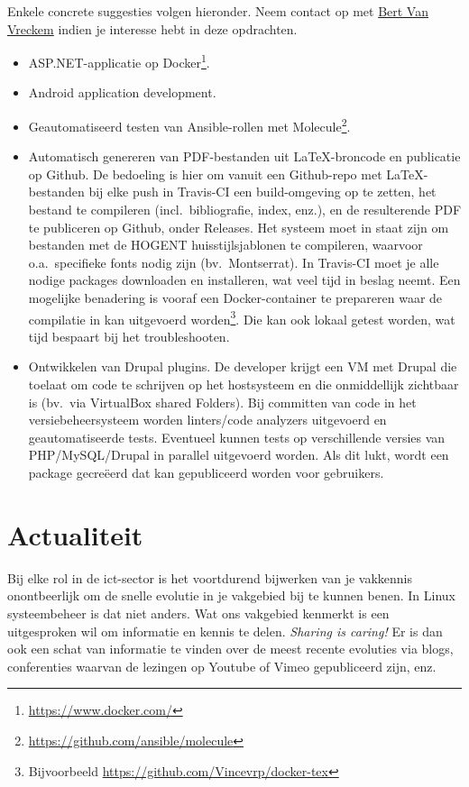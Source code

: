 Enkele concrete suggesties volgen hieronder. Neem contact op met \href{mailto:bert.vanvreckem@hogent.be}{Bert Van Vreckem} indien je interesse hebt in deze opdrachten.

\begin{itemize}
  \item ASP.NET-applicatie op Docker\footnote{\url{https://www.docker.com/}}.
  
  \item Android application development.
  
  \item Geautomatiseerd testen van Ansible-rollen met Molecule\footnote{\url{https://github.com/ansible/molecule}}.
  
  \item Automatisch genereren van PDF-bestanden uit \LaTeX{}-broncode en publicatie op Github. De bedoeling is hier om vanuit een Github-repo met \LaTeX-{}be\-stan\-den bij elke push in Travis-CI een build-omgeving op te zetten, het bestand te compileren (incl.\ bibliografie, index, enz.), en de resulterende PDF te publiceren op Github, onder Releases. Het systeem moet in staat zijn om bestanden met de HOGENT huisstijlsjablonen te compileren, waarvoor o.a.\ specifieke fonts nodig zijn (bv.\ Montserrat). In Travis-CI moet je alle nodige packages downloaden en installeren, wat veel tijd in beslag neemt. Een mogelijke benadering is vooraf een Docker-container te prepareren waar de compilatie in kan uitgevoerd worden\footnote{Bijvoorbeeld \url{https://github.com/Vincevrp/docker-tex}}. Die kan ook lokaal getest worden, wat tijd bespaart bij het troubleshooten.

  \item Ontwikkelen van Drupal plugins. De developer krijgt een VM met Drupal die toelaat om code te schrijven op het hostsysteem en die onmiddellijk zichtbaar is (bv.\ via VirtualBox shared Folders). Bij committen van code in het versiebeheersysteem worden linters/code analyzers uitgevoerd en geautomatiseerde tests. Eventueel kunnen tests op verschillende versies van PHP/MySQL/Drupal in parallel uitgevoerd worden. Als dit lukt, wordt een package gecreëerd dat kan gepubliceerd worden voor gebruikers.
\end{itemize}

\section{Actualiteit}%
\label{sec:actualiteit}

Bij elke rol in de ict-sector is het voortdurend bijwerken van je vakkennis onontbeerlijk om de snelle evolutie in je vakgebied bij te kunnen benen. In Linux systeembeheer is dat niet anders. Wat ons vakgebied kenmerkt is een uitgesproken wil om informatie en kennis te delen. \emph{Sharing is caring!} Er is dan ook een schat van informatie te vinden over de meest recente evoluties via blogs, conferenties waarvan de lezingen op Youtube of Vimeo gepubliceerd zijn, enz.

